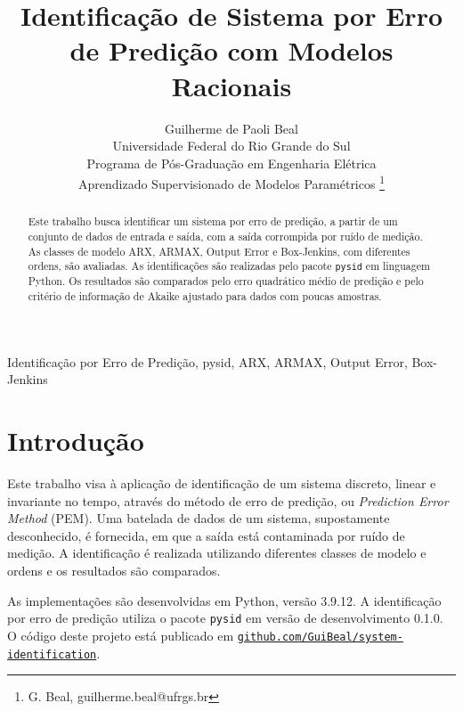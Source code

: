 \documentclass{ppgeesa}
\begin{document}

\title{Identificação de Sistema por Erro de Predição com Modelos Racionais}
\author{Guilherme de Paoli Beal
  \\
  {\small Universidade Federal do Rio Grande do Sul
  \\
  Programa de Pós-Graduação em Engenharia Elétrica
  \\
  Aprendizado Supervisionado de Modelos Paramétricos}
  \thanks{G. Beal, guilherme.beal@ufrgs.br}
}
\maketitle
\thispagestyle{empty}\pagestyle{empty}

\begin{abstract}
  Este trabalho busca identificar um sistema por erro de predição, a partir de um conjunto de dados de entrada e saída, com a saída corrompida por ruído de medição.
  As classes de modelo ARX, ARMAX, Output Error e Box-Jenkins, com diferentes ordens, são avaliadas.
  As identificações são realizadas pelo pacote \texttt{pysid} em linguagem Python.
  Os resultados são comparados pelo erro quadrático médio de predição e pelo critério de informação de Akaike ajustado para dados com poucas amostras.
\end{abstract}

\begin{IEEEkeywords}
  Identificação por Erro de Predição, pysid, ARX, ARMAX, Output Error, Box-Jenkins
\end{IEEEkeywords}

\section{Introdução}

Este trabalho visa à aplicação de identificação de um sistema discreto, linear e invariante no tempo, através do método de erro de predição, ou \emph{Prediction Error Method} (PEM).
Uma batelada de dados de um sistema, supostamente desconhecido, é fornecida, em que a saída está contaminada por ruído de medição.
A identificação é realizada utilizando diferentes classes de modelo e ordens e os resultados são comparados.

As implementações são desenvolvidas em Python, versão 3.9.12.
A identificação por erro de predição utiliza o pacote \texttt{pysid} em versão de desenvolvimento 0.1.0.
O código deste projeto está publicado em \href{https://github.com/GuiBeal/system-identification}{\texttt{github.com/GuiBeal/system-identification}}.
\end{document}
